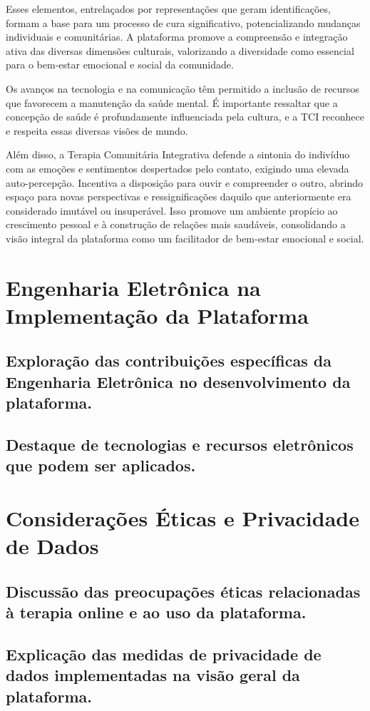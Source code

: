Esses elementos, entrelaçados por representações que geram identificações, formam a base para um processo de cura significativo, potencializando mudanças individuais e comunitárias. A plataforma promove a compreensão e integração ativa das diversas dimensões culturais, valorizando a diversidade como essencial para o bem-estar emocional e social da comunidade.

Os avanços na tecnologia e na comunicação têm permitido a inclusão de recursos que favorecem a manutenção da saúde mental. É importante ressaltar que a concepção de saúde é profundamente influenciada pela cultura, e a TCI reconhece e respeita essas diversas visões de mundo.

Além disso, a Terapia Comunitária Integrativa defende a sintonia do indivíduo com as emoções e sentimentos despertados pelo contato, exigindo uma elevada auto-percepção. Incentiva a disposição para ouvir e compreender o outro, abrindo espaço para novas perspectivas e ressignificações daquilo que anteriormente era considerado imutável ou insuperável. Isso promove um ambiente propício ao crescimento pessoal e à construção de relações mais saudáveis, consolidando a visão integral da plataforma como um facilitador de bem-estar emocional e social.


\chapter{Engenharia Eletrônica na Implementação da Plataforma}
\section{Exploração das contribuições específicas da Engenharia Eletrônica no desenvolvimento da plataforma.}
\section{Destaque de tecnologias e recursos eletrônicos que podem ser aplicados.}

\chapter{Considerações Éticas e Privacidade de Dados}
\section{Discussão das preocupações éticas relacionadas à terapia online e ao uso da plataforma.}
\section{Explicação das medidas de privacidade de dados implementadas na visão geral da plataforma.}

